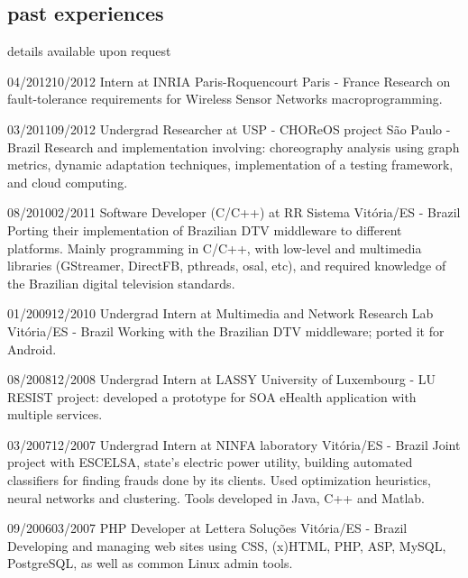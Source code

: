 \documentclass{nirev-cv}
\begin{document}
\subsection{past experiences}
details available upon request

\begin{entrylist}

\shortworkentry
  {04/2012}{10/2012}
  {Intern at INRIA Paris-Roquencourt}
  {Paris - France}
  {Research on fault-tolerance requirements for Wireless Sensor Networks macroprogramming.}

\shortworkentry
  {03/2011}{09/2012}
  {Undergrad Researcher at USP - CHOReOS project}
  {São Paulo - Brazil}
  {Research and implementation involving: choreography analysis using graph metrics,
  dynamic adaptation techniques, implementation of a testing framework, and cloud computing.}

\shortworkentry
  {08/2010}{02/2011}
  {Software Developer (C/C++) at RR Sistema}
  {Vitória/ES - Brazil}
  {Porting their implementation of Brazilian DTV middleware to different platforms.
  Mainly programming in C/C++, with low-level and multimedia libraries (GStreamer, DirectFB, pthreads, osal, etc),
  and required knowledge of the Brazilian digital television standards.}

\shortworkentry
  {01/2009}{12/2010}
  {Undergrad Intern at Multimedia and Network Research Lab}
  {Vitória/ES - Brazil}
  {Working with the Brazilian DTV middleware; ported it for Android. }

\shortworkentry
  {08/2008}{12/2008}
  {Undergrad Intern at LASSY}
  {University of Luxembourg - LU}
  {RESIST project: developed a prototype for SOA eHealth application with multiple services.}


\shortworkentry
  {03/2007}{12/2007}
  {Undergrad Intern at NINFA laboratory}
  {Vitória/ES - Brazil}
  {Joint project with ESCELSA, state's electric power utility, building automated classifiers
  for finding frauds done by its clients. Used optimization heuristics, neural networks and clustering.
  Tools developed in Java, C++ and Matlab.}

\shortworkentry
  {09/2006}{03/2007}
  {PHP Developer at Lettera Soluções}
  {Vitória/ES - Brazil}
  {Developing and managing web sites using CSS, (x)HTML, PHP, ASP, MySQL, PostgreSQL, as well as common Linux admin tools.}
\end{entrylist}
\end{document}
